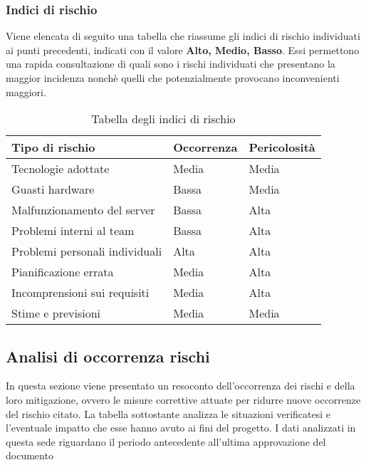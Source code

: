 \begin{minipage}{\linewidth}
	
\subsubsection{Indici di rischio}

Viene elencata di seguito una tabella che riassume gli indici di rischio individuati ai punti precedenti, indicati con il valore \textbf{Alto, Medio, Basso}. Essi permettono una rapida consultazione di quali sono i rischi individuati che presentano la maggior incidenza nonchè quelli che potenzialmente provocano inconvenienti maggiori. 

\begin{table}[H]
	\begin{center}
		\begin{tabular}{>{\centering\arraybackslash} m{6cm}  >{\centering\arraybackslash} m{4cm} >{\centering\arraybackslash} m{4cm}}
			\hline
			\textbf{Tipo di rischio}	& \textbf{Occorrenza} & \textbf{Pericolosità}\\
			\hline
			Tecnologie adottate	&	Media 	& 	Media	\\
			\hline
			Guasti hardware	&	Bassa 	& 	Media	\\
			\hline
			Malfunzionamento del server	&	Bassa 	& 	Alta	\\
			\hline
			Problemi interni al team	&	Bassa 	& 	Alta	\\
			\hline
			Problemi personali individuali	&	Alta 	& 	Alta	\\
			\hline
			Pianificazione errata	&	Media 	& 	Alta	\\
			\hline
			Incomprensioni sui requisiti	&	Media 	& 	Alta	\\
			\hline
			Stime e previsioni	&	Media 	& 	Media	\\
			\hline
		\end{tabular}
		\caption{Tabella degli indici di rischio}
	\end{center}
\end{table}
\end{minipage}

\subsection{Analisi di occorrenza rischi}
In questa sezione viene presentato un resoconto dell'occorrenza dei rischi e della loro mitigazione, ovvero le misure correttive attuate per ridurre nuove occorrenze del rischio citato. La tabella sottostante analizza le situazioni verificatesi e l'eventuale impatto che esse hanno avuto ai fini del progetto. I dati analizzati in questa sede riguardano il periodo antecedente all'ultima approvazione del documento

